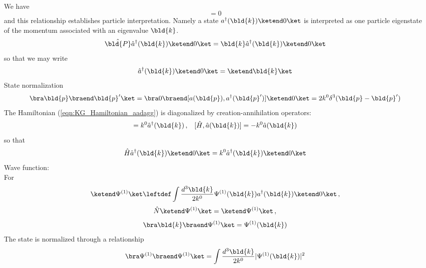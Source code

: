 \\
We have
\begin{equation}
[ \hat{P}^\mu, \hat{N}] = 0
\label{eqn:commutingHandN}
\end{equation}
and this relationship establishes particle interpretation.
Namely a state $a^\dagger({\bld{k}})\ketend 0 \ket$ is interpreted as
one particle eigenstate of the momentum associated with an eigenvalue $\bld{k}$.
\begin{equation}
\hat{\bld{P}} \hat{a}^\dagger(\bld{k}) \ketend 0 \ket
=
\bld{k} \hat{a}^\dagger(\bld{k}) \ketend 0 \ket
\end{equation}
so that we may write
\begin{equation}
\hat{a}^\dagger(\bld{k}) \ketend 0 \ket = \ketend \bld{k} \ket
\end{equation}
State normalization
\[
\bra \bld{p} \braend \bld{p}' \ket
= \bra 0 \braend [a(\bld{p}), a^\dagger(\bld{p}')] \ketend 0 \ket
= 2 k^0 \delta^3 (\bld{p} - \bld{p}')
\]
The Hamiltonian (\ref{eqn:KG_Hamiltonian_aadagg}) is diagonalized
by creation-annihilation operators:
\begin{equation}
[ \hat{H}, \hat{a}^\dagger(\bld{k}) ] = k^0 \hat{a}^\dagger(\bld{k})
\,, \hspace{3mm}
[ \hat{H}, \hat{a}(\bld{k}) ] = - k^0 \hat{a}(\bld{k})
\label{eqn:KGcommHanda}
\end{equation}
so that
\begin{equation}
\hat{H} \hat{a}^\dagger(\bld{k}) \ketend 0 \ket
=
k^0 \hat{a}^\dagger(\bld{k}) \ketend 0 \ket
\end{equation}
Wave function:\\
For
\begin{equation*}
\ketend \Psi^{(1)} \ket
\leftdef
\int \frac{d^3 \bld{k}}{2k^0}  \Psi^{(1)} (\bld{k}) a^\dagger(\bld{k}) \ketend 0 \ket\,,
\end{equation*}
\begin{equation*}
\hat{N} \ketend \Psi^{(1)} \ket = \ketend \Psi^{(1)} \ket\,,
\end{equation*}
\begin{equation*}
\bra \bld{k} \braend \Psi^{(1)} \ket
=  \Psi^{(1)} (\bld{k})
\end{equation*}
The state is normalized through a relationship
\begin{eqnarray*}
\bra \Psi^{(1)} \braend \Psi^{(1)} \ket
=
\int \frac{d^3 \bld{k}}{2k^0}  |\Psi^{(1)}(\bld{k})|^2
\end{eqnarray*}

